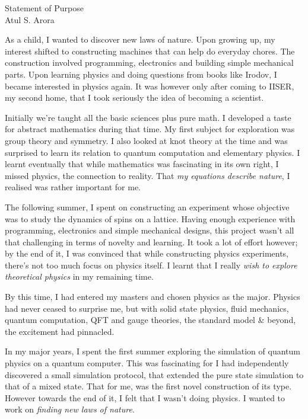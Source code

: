 \setlength{\oddsidemargin}{-0.2in}
\setlength{\evensidemargin}{0in}
\setlength{\textwidth}{6.7in}
\setlength{\topmargin}{-1.1in}
\setlength{\textheight}{11in}
\pagestyle{empty}



\begin{center}
{\Large Statement of Purpose} \\[.1in]
{\large Atul S. Arora}
\end{center}

\vspace*{.1in}
As a child, I wanted to discover new laws of nature. Upon growing up, my interest shifted to constructing machines that can help do everyday chores. The construction involved programming, electronics and building simple mechanical parts. Upon learning physics and doing questions from books like Irodov, I became interested in physics again. It was however only after coming to IISER, my second home, that I took seriously the idea of becoming a scientist. 


Initially we're taught all the basic sciences plus pure math. I developed a taste for abstract mathematics during that time. My first subject for exploration was group theory and symmetry. I also looked at knot theory at the time and was surprised to learn its relation to quantum computation and elementary physics. I learnt eventually that while mathematics was fascinating in its own right, I missed physics, the connection to reality. That \emph{my equations describe nature}, I realised was rather important for me.


The following summer, I spent on constructing an experiment whose objective was to study the dynamics of spins on a lattice. Having enough experience with programming, electronics and simple mechanical designs, this project wasn't all that challenging in terms of novelty and learning. It took a lot of effort however; by the end of it, I was convinced that while constructing physics experiments, there's not too much focus on physics itself. I learnt that I really \emph{wish to explore theoretical physics} in my remaining time.


By this time, I had entered my masters and chosen physics as the major. Physics had never ceased to surprise me, but with solid state physics, fluid mechanics, quantum computation, QFT and gauge theories, the standard model \& beyond, the excitement had pinnacled. 


In my major years, I spent the first summer exploring the simulation of quantum physics  on a quantum computer. This was fascinating for I had independently discovered a small simulation protocol, that extended the pure state simulation to that of a mixed state. That for me, was the first novel construction of its type. However towards the end of it, I felt that I wasn't doing physics. I wanted to work on \emph{finding new laws of nature}.


